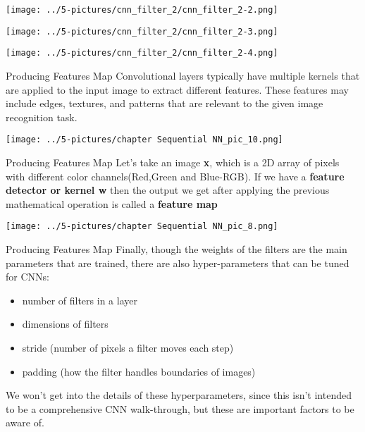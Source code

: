 \documentclass[11pt]{beamer}
\begin{document}
\begin{frame}
	\begin{center}
	\texttt{[image: ../5-pictures/cnn\_filter\_2/cnn\_filter\_2-2.png]}
	\end{center}
\end{frame}
\begin{frame}
	\begin{center}
	\texttt{[image: ../5-pictures/cnn\_filter\_2/cnn\_filter\_2-3.png]}
	\end{center}
\end{frame}
\begin{frame}
	\begin{center}
	\texttt{[image: ../5-pictures/cnn\_filter\_2/cnn\_filter\_2-4.png]}
	\end{center}
\end{frame}
\begin{frame}{Producing Features Map}
\footnotesize{
Convolutional layers typically have multiple kernels that are applied to the input image to extract different features. These features may include edges, textures, and patterns that are relevant to the given image recognition task.}
	\begin{center}
	\texttt{[image: ../5-pictures/chapter Sequential NN\_pic\_10.png]}
	\end{center}
\end{frame}
\begin{frame}{Producing Features Map}
Let's take an image \textbf{x}, which is a 2D array of pixels with different color channels(Red,Green and Blue-RGB). If we have a  \textbf{ feature detector or kernel w} then the output we get after applying the previous mathematical operation is called a  \textbf{ feature map}
	\begin{center}
	\texttt{[image: ../5-pictures/chapter Sequential NN\_pic\_8.png]}
	\end{center}
\end{frame}
\begin{frame}{Producing Features Map}
Finally, though the weights of the filters are the main parameters that are trained, there are also hyper-parameters that can be tuned for CNNs:
	\begin{itemize}
		\item number of filters in a layer
		\item dimensions of filters
		\item stride (number of pixels a filter moves each step)
		\item padding (how the filter handles boundaries of images)
	\end{itemize}
We won't get into the details of these hyperparameters, since this isn't intended to be a comprehensive CNN walk-through, but these are important factors to be aware of.
\end{frame}
\end{document}
